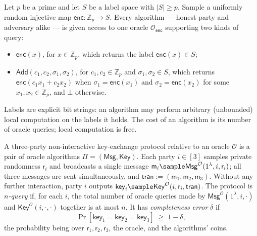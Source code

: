 \documentclass{conjura-conjecture}
\newcommand{\Zp}{\mathbb{Z}_{p}}
\newcommand{\enc}{\mathsf{enc}}
\newcommand{\Add}{\mathsf{Add}}
\newcommand{\Oenc}{\mathcal{O}_{\enc}}
\newcommand{\Msg}{\mathsf{Msg}}
\newcommand{\Key}{\mathsf{Key}}
\newcommand{\tran}{\mathsf{tran}}
\newcommand{\keyv}{\mathsf{key}}
\newcommand{\rv}{\mathsf{r}}
\newcommand{\mv}{\mathsf{m}}
\begin{document}
\begin{definition}\label{def:sggm}
Let $p$ be a prime and let $S$ be a label space with
$\lvert S\rvert \ge p$. Sample a uniformly random injective map
$\enc : \Zp \to S$. Every algorithm --- honest party and adversary
alike --- is given access to one oracle $\Oenc$ supporting two kinds of
query:
\begin{itemize}
  \item $\enc(x)$, for $x \in \Zp$, which returns the label
    $\enc(x) \in S$;
  \item $\Add(c_{1}, c_{2}, \sigma_{1}, \sigma_{2})$, for
    $c_{1}, c_{2} \in \Zp$ and $\sigma_{1}, \sigma_{2} \in S$, which
    returns $\enc(c_{1} x_{1} + c_{2} x_{2})$ when
    $\sigma_{1} = \enc(x_{1})$ and $\sigma_{2} = \enc(x_{2})$ for some
    $x_{1}, x_{2} \in \Zp$, and $\bot$ otherwise.
\end{itemize}
Labels are explicit bit strings: an algorithm may perform arbitrary
(unbounded) local computation on the labels it holds. The cost of an
algorithm is its number of oracle queries; local computation is free.
\end{definition}

\begin{definition}\label{def:nike}
A three-party non-interactive key-exchange protocol relative to an
oracle $\mathcal{O}$ is a pair of oracle algorithms
$\Pi = (\Msg, \Key)$. Each party $i \in [3]$ samples private randomness
$\rv_{i}$ and broadcasts a single message
$\mv_{i} \sample \Msg^{\mathcal{O}}(1^{\lambda}, i, \rv_{i})$; all three
messages are sent simultaneously, and
$\tran := (\mv_{1}, \mv_{2}, \mv_{3})$. Without any further interaction,
party $i$ outputs
$\keyv_{i} \sample \Key^{\mathcal{O}}(i, \rv_{i}, \tran)$. The protocol
is \emph{$n$-query} if, for each $i$, the total number of oracle queries
made by $\Msg^{\mathcal{O}}(1^{\lambda}, i, \cdot)$ and
$\Key^{\mathcal{O}}(i, \cdot, \cdot)$ together is at most $n$. It has
\emph{completeness error} $\delta$ if
\[
  \Pr\!\left[\keyv_{1} = \keyv_{2} = \keyv_{3}\right] \;\ge\; 1 - \delta ,
\]
the probability being over $\rv_{1}, \rv_{2}, \rv_{3}$, the oracle, and
the algorithms' coins.
\end{definition}
\end{document}
